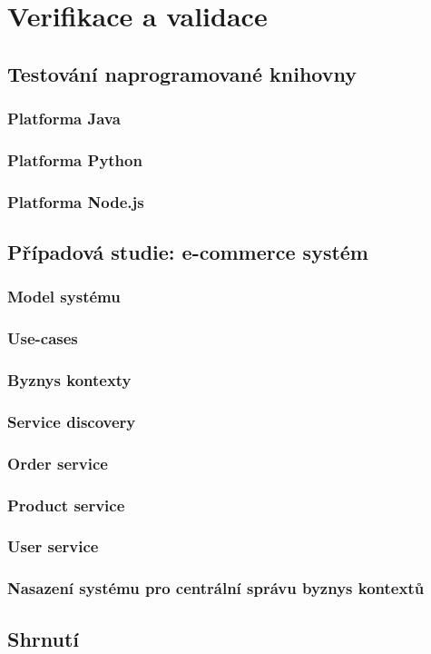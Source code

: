
\chapter{Verifikace a validace}\label{ch:verifikace}

\section{Testování naprogramované knihovny}

\subsection{Platforma Java}

\subsection{Platforma Python}

\subsection{Platforma Node.js}

\section{Případová studie: e-commerce systém}

\subsection{Model systému}

\subsection{Use-cases}

\subsection{Byznys kontexty}

\subsection{Service discovery}

\subsection{Order service}

\subsection{Product service}

\subsection{User service}

\subsection{Nasazení systému pro centrální správu byznys kontextů}

\section{Shrnutí}
